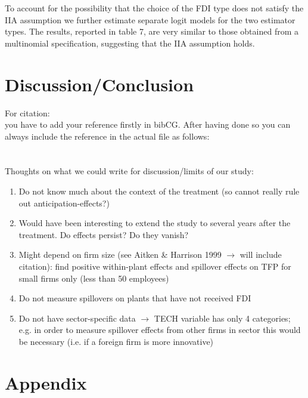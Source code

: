 \documentclass[a4paper,11pt]{scrartcl}
\newcommand{\sectionnumbering}[1]{%
  \setcounter{section}{0}%
   \renewcommand{\thesection}{\csname #1\endcsname{section}}}
\begin{document}
To account for the possibility that the choice of the FDI type does not satisfy the IIA assumption we further estimate separate logit models for the two estimator types. The results, reported in table 7, are very similar to those obtained from a multinomial specification, suggesting that the IIA assumption holds.  





\section{Discussion/Conclusion}
For citation: \\
you have to add your reference firstly in bibCG. After having done so you can always include the reference in the actual file as follows: \\
 \citet{biddle1990sleep}\\
\citep[p.~35]{CaliendoHujerThomsen2008}	 \\


Thoughts on what we could write for discussion/limits of our study: 
\begin{enumerate}
\item Do not know much about the context of the treatment (so cannot really rule out anticipation-effects?)
\item Would have been interesting to extend the study to several years after the treatment. Do effects persist? Do they vanish? 
\item Might depend on firm size (see Aitken \& Harrison 1999 $\rightarrow$ will include citation): find positive within-plant effects and spillover effects on TFP for small firms only (less than 50 employees)
\item Do not measure spillovers on plants that have not received FDI
\item Do not have sector-specific data $\rightarrow$ TECH variable has only 4 categories; e.g. in order to measure spillover effects from other firms in sector this would be necessary (i.e. if a foreign firm is more innovative)
\end{enumerate}


\newpage

 
\newpage



\section*{Appendix}
\sectionnumbering{Roman}
\setcounter{page}{3} %
\end{document}
